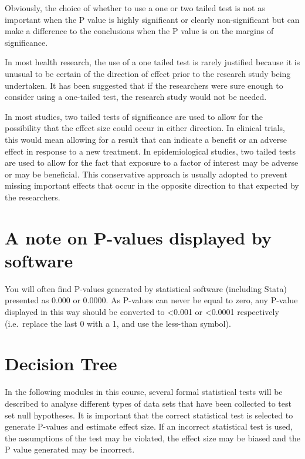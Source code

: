 \documentclass[
]{memoir}
\begin{document}
Obviously, the choice of whether to use a one or two tailed test is not as important when the P value is highly significant or clearly non-significant but can make a difference to the conclusions when the P value is on the margins of significance.

In most health research, the use of a one tailed test is rarely justified because it is unusual to be certain of the direction of effect prior to the research study being undertaken. It has been suggested that if the researchers were sure enough to consider using a one-tailed test, the research study would not be needed.

In most studies, two tailed tests of significance are used to allow for the possibility that the effect size could occur in either direction. In clinical trials, this would mean allowing for a result that can indicate a benefit or an adverse effect in response to a new treatment. In epidemiological studies, two tailed tests are used to allow for the fact that exposure to a factor of interest may be adverse or may be beneficial. This conservative approach is usually adopted to prevent missing important effects that occur in the opposite direction to that expected by the researchers.

\hypertarget{a-note-on-p-values-displayed-by-software}{%
\section{A note on P-values displayed by software}\label{a-note-on-p-values-displayed-by-software}}

You will often find P-values generated by statistical software (including Stata) presented as 0.000 or 0.0000. As P-values can never be equal to zero, any P-value displayed in this way should be converted to \textless0.001 or \textless0.0001 respectively (i.e.~replace the last 0 with a 1, and use the less-than symbol).

\hypertarget{decision-tree}{%
\section{Decision Tree}\label{decision-tree}}

In the following modules in this course, several formal statistical tests will be described to analyse different types of data sets that have been collected to test set null hypotheses. It is important that the correct statistical test is selected to generate P-values and estimate effect size. If an incorrect statistical test is used, the assumptions of the test may be violated, the effect size may be biased and the P value generated may be incorrect.
\end{document}
